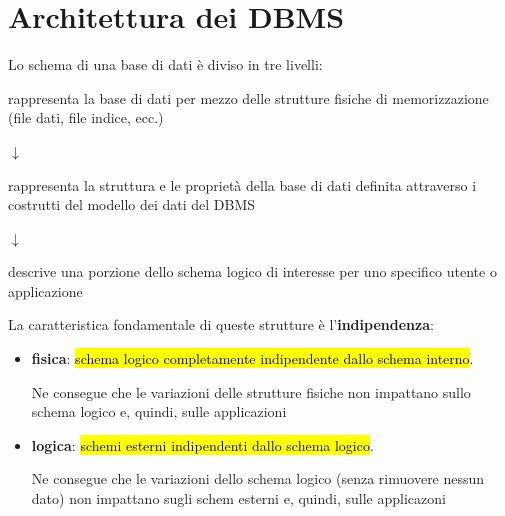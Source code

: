 \documentclass[12pt, a4paper, oneside]{book}
\begin{document}
    \section{Architettura dei DBMS}
    Lo schema di una base di dati è diviso in tre livelli:
    \begin{description}
      \centering
      \item[\textcolor{azzurrino}{livello interno}]
      \item rappresenta la base di dati per mezzo delle strutture fisiche di memorizzazione (file dati, file indice, ecc.)
      
      \smallskip

      \item $\downarrow$
      
      \smallskip

      \item[\textcolor{azzurrino}{livello logico}]
      \item rappresenta la struttura e le proprietà della base di dati definita attraverso i costrutti del modello dei dati del DBMS
      
      \smallskip

      \item $\downarrow$
      
      \smallskip

      \item[\textcolor{azzurrino}{livello esterno}]
      \item descrive una porzione dello schema logico di interesse per uno specifico utente o applicazione
    \end{description}

    \medskip

    La caratteristica fondamentale di queste strutture è l'\textbf{indipendenza}:
    \begin{itemize}[label=$\star$]
      \item \textcolor{azzurrino}{\textbf{fisica}}: \hl{schema logico completamente indipendente dallo schema interno}.
      
      Ne consegue che le variazioni delle strutture fisiche non impattano sullo schema logico e, quindi, sulle applicazioni

      \smallskip

      \item \textcolor{azzurrino}{\textbf{logica}}: \hl{schemi esterni indipendenti dallo schema logico}.
      
      Ne consegue che le variazioni dello schema logico (senza rimuovere nessun dato) non impattano sugli schem esterni e, quindi, sulle applicazoni
    \end{itemize}
\end{document}
